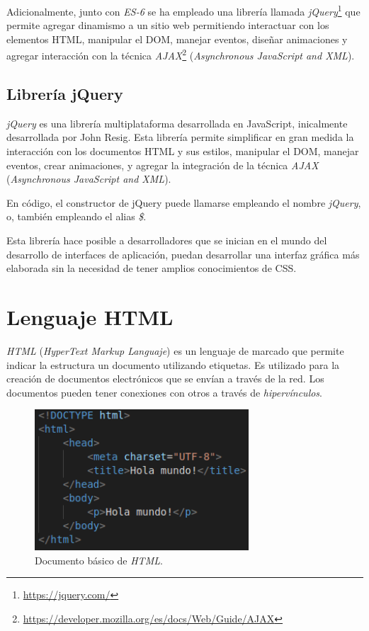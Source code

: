 \documentclass[a4paper, 12pt]{book}
\begin{document}
Adicionalmente, junto con \textit{ES-6} se ha empleado una librería llamada \textit{jQuery}\footnote{\url{https://jquery.com/}} que permite agregar dinamismo a un sitio web permitiendo interactuar con los elementos HTML, manipular el DOM, manejar eventos, diseñar animaciones y agregar interacción con la técnica \textit{AJAX}\footnote{\url{https://developer.mozilla.org/es/docs/Web/Guide/AJAX}} (\textit{Asynchronous JavaScript and XML}).

\subsection{Librería jQuery}
\label{subsec:javascript}

\textit{jQuery} es una librería multiplataforma desarrollada en JavaScript, inicalmente desarrollada por John Resig. Esta librería permite simplificar en gran medida la interacción con los documentos HTML y sus estilos, manipular el DOM, manejar eventos, crear animaciones, y agregar la integración de la técnica \textit{AJAX} (\textit{Asynchronous JavaScript and XML}).

En código, el constructor de jQuery puede llamarse empleando el nombre \textit{jQuery}, o, también empleando el alias \textit{\$}.

Esta librería hace posible a desarrolladores que se inician en el mundo del desarrollo de interfaces de aplicación, puedan desarrollar una interfaz gráfica más elaborada sin la necesidad de tener amplios conocimientos de CSS.

\section{Lenguaje HTML}

\textit{HTML} (\textit{HyperText Markup Languaje}) es un lenguaje de marcado que permite indicar la estructura un documento utilizando etiquetas. Es utilizado para la creación de documentos electrónicos que se envían a través de la red. Los documentos pueden tener conexiones con otros a través de \textit{hipervínculos}.

\begin{figure}[H]
	\centering
    \includegraphics[width=8cm]{img/html}
    \caption{Documento básico de \textit{HTML}.}
    \label{figura:simulador_gazebo}
\end{figure}
\end{document}
